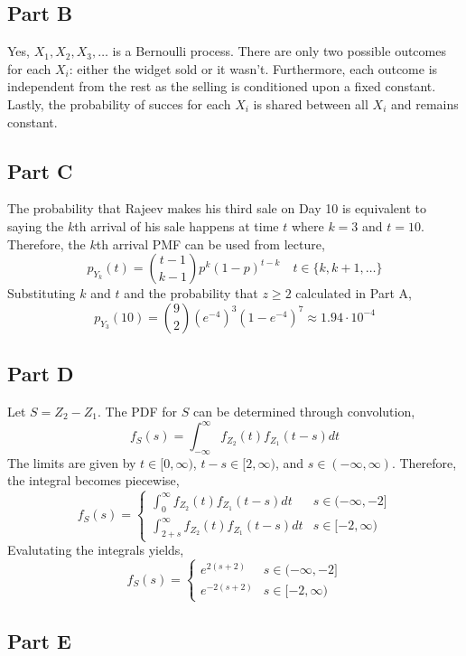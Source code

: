 \documentclass{article}
\begin{document}
\subsection*{Part B}

Yes, $X_1, X_2, X_3, \ldots$ is a Bernoulli process. There are only two
possible outcomes for each $X_i$: either the widget sold or it wasn't.
Furthermore, each outcome is independent from the rest as the selling is
conditioned upon a fixed constant. Lastly, the probability of succes for each
$X_i$ is shared between all $X_i$ and remains constant.

\subsection*{Part C}

The probability that Rajeev makes his third sale on Day 10 is equivalent to
saying the $k$th arrival of his sale happens at time $t$ where $k = 3$ and $t
= 10$. Therefore, the $k$th arrival PMF can be used from lecture,
$$ p_{Y_k}(t) = \binom{t - 1}{k - 1} p^k (1 - p)^{t - k} \quad t \in \{k, k +
1, \ldots \}$$
Substituting $k$ and $t$ and the probability that $z \geq 2$ calculated in
Part A,
$$ p_{Y_3}(10) = \binom{9}{2} \left(e^{-4}\right)^3 \left(1 -
e^{-4}\right)^{7} \approx 1.94 \cdot 10^{-4} $$

\subsection*{Part D}

Let $S = Z_2 - Z_1$. The PDF for $S$ can be determined through convolution,
$$ f_S(s) = \int_{-\infty}^\infty f_{Z_2}(t) f_{Z_1}(t - s) dt $$
The limits are given by $t \in [0, \infty)$, $t - s \in [2, \infty)$, and $s
\in (-\infty, \infty)$. Therefore, the integral becomes piecewise,
$$ f_S(s) = \begin{cases}
  \int_0^\infty f_{Z_2}(t) f_{Z_1}(t - s) dt & s \in (-\infty, -2] \\
  \int_{2 + s}^\infty f_{Z_2}(t) f_{Z_1}(t - s) dt & s \in [-2, \infty)
\end{cases} $$
Evalutating the integrals yields,
$$ f_S(s) = \begin{cases}
  e^{2(s + 2)} & s \in (-\infty, -2] \\
  e^{-2(s + 2)} & s \in [-2, \infty)
\end{cases} $$

\subsection*{Part E}
\end{document}
